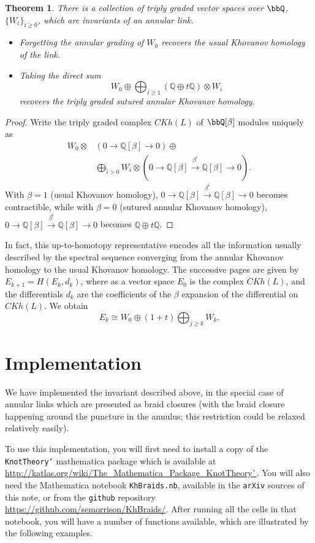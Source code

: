 \documentclass{amsart}
\theoremstyle{plain}
\newtheorem{thm}[prop]{Theorem}
\newcommand{\complexzero}{0\rightarrow\mathbb Q [\beta]\rightarrow 0}
\newcommand{\complexk}[1]{0\rightarrow\mathbb Q [\beta]\xrightarrow{\beta^{#1}}{}\mathbb Q [\beta]\rightarrow 0}
\begin{document}
\begin{thm}
There is a collection of triply graded vector spaces over $\bbQ$, $\{W_i\}_{i \geq 0}$, which are invariants of an annular link.
\begin{itemize}
\item Forgetting the annular grading of $W_0$ recovers the usual Khovanov homology of the link.
\item Taking the direct sum $$W_0 \oplus \bigoplus_{i \geq 1} (\mathbb Q \oplus t \mathbb Q) \otimes W_i$$ recovers the triply graded sutured annular Khovanov homology.
\end{itemize}
\end{thm}
\begin{proof}
Write the triply graded complex $CKh(L)$ of $\bbQ[\beta]$ modules uniquely as 
\begin{align*}
W_0 \otimes & \left(\complexzero\right) \oplus \\
            & \bigoplus_{i > 0} W_i \otimes \left( \complexk{i} \right).
\end{align*}
With $\beta = 1$ (usual Khovanov homology), $\complexk{i}$ becomes contractible, while with $\beta = 0$ (sutured annular Khovanov homology), $\complexk{i}$ becomes $\mathbb Q \oplus t \mathbb Q$.
\end{proof}

In fact, this up-to-homotopy representative encodes all the information usually described by the spectral sequence converging from the annular Khovanov homology to the usual Khovanov homology. The successive pages are given by 
$E_{k+1} = H(E_k, d_k)$, where as a vector space $E_0$ is the complex $CKh(L)$, and the differentials $d_k$ are the coefficients of the $\beta$ expansion of the differential on $CKh(L)$. We obtain
$$E_k \cong W_0 \oplus (1+t) \bigoplus_{j \geq k} W_k.$$

\section{Implementation}
We have implemented the invariant described above, in the special case of annular links which are presented as braid closures (with the braid closure happening around the puncture in the annulus; this restriction could be relaxed relatively easily).

To use this implementation, you will first need to install a copy of the {\tt KnotTheory`} mathematica package which is available at \url{http://katlas.org/wiki/The_Mathematica_Package_KnotTheory`}. You will also need the Mathematica notebook {\tt KhBraids.nb}, available 
in the {\tt arXiv} sources of this note, or from
the {\tt github} repository \url{https://github.com/semorrison/KhBraids/}. After running all the cells in that notebook, you will have a number of functions available, which are illustrated by the following examples.
\end{document}
